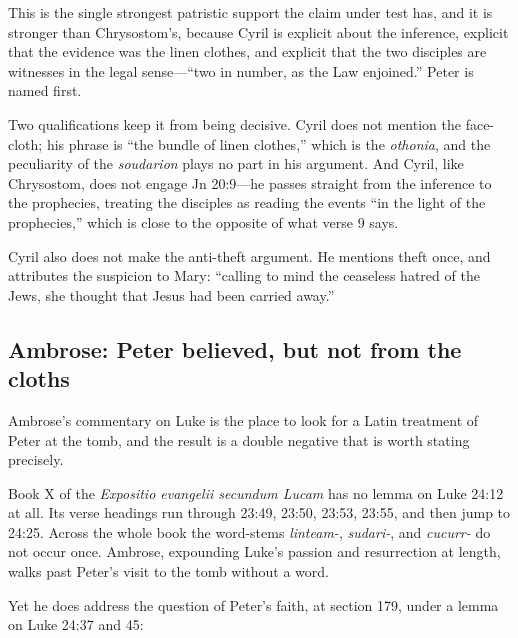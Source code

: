 This is the single strongest patristic support the claim under test has, and it
is stronger than Chrysostom's, because Cyril is explicit about the inference,
explicit that the evidence was the linen clothes, and explicit that the two
disciples are witnesses in the legal sense---``two in number, as the Law
enjoined.'' Peter is named first.

Two qualifications keep it from being decisive. Cyril does not mention the
face-cloth; his phrase is ``the bundle of linen clothes,'' which is the
\emph{othonia}, and the peculiarity of the \emph{soudarion} plays no part in
his argument. And Cyril, like Chrysostom, does not engage Jn 20:9---he passes
straight from the inference to the prophecies, treating the disciples as
reading the events ``in the light of the prophecies,'' which is close to the
opposite of what verse 9 says.

Cyril also does not make the anti-theft argument. He mentions theft once, and
attributes the suspicion to Mary: ``calling to mind the ceaseless hatred of the
Jews, she thought that Jesus had been carried away.''

\subsection{Ambrose: Peter believed, but not from the cloths}

Ambrose's commentary on Luke is the place to look for a Latin treatment of
Peter at the tomb, and the result is a double negative that is worth stating
precisely.

Book X of the \emph{Expositio evangelii secundum Lucam} has no lemma on Luke
24:12 at all. Its verse headings run through 23:49, 23:50, 23:53, 23:55, and
then jump to 24:25. Across the whole book the word-stems \emph{linteam-},
\emph{sudari-}, and \emph{cucurr-} do not occur once. Ambrose, expounding Luke's passion and resurrection at length, walks
past Peter's visit to the tomb without a word.

Yet he does address the question of Peter's faith, at section 179, under a
lemma on Luke 24:37 and 45:

